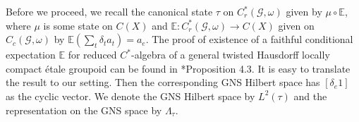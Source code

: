 \documentclass[a4paper,11pt,reqno]{amsart}
\theoremstyle{plain}
\newtheorem{thm}{Theorem}[section]
\theoremstyle{mainthmstyle}
\theoremstyle{named}
\numberwithin{equation}{section}
\newcommand{\Bea}{\begin{eqnarray*}}
\newcommand{\Eea}{\end{eqnarray*}}
\begin{document}

Before we proceed, we recall the canonical state $\tau$ on $C^{\ast}_{r}(\mathcal{G},\omega)$ given by $\mu\circ\mathbb{E}$, where $\mu$ is some state on $C(X)$ and $\mathbb{E}:C^{\ast}_{r}(\mathcal{G},\omega)\to C(X)$ given on $C_{c}(\mathcal{G},\omega)$ by $\mathbb{E}(\sum\limits_{t}\delta_{t}a_{t})=a_{e}$. The proof of existence of a faithful conditional expectation $\mathbb{E}$ for reduced $C^{\ast}$-algebra of a general twisted Hausdorff locally compact étale groupoid can be found in \cite{renault2008cartan}*{Proposition 4.3}. It is easy to translate the result to our setting. Then the corresponding GNS Hilbert space has $[\delta_{e}1]$ as the cyclic vector. We denote the GNS Hilbert space by $L^{2}(\tau)$ and the representation on the GNS space by $\Lambda_{\tau}$.
\end{document}
